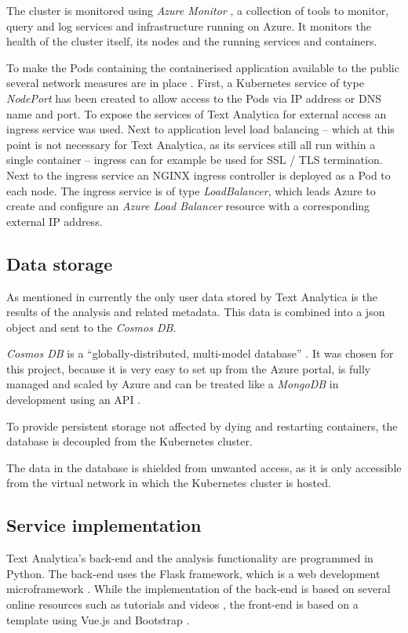\documentclass[conference]{IEEEtran}
\begin{document}
The cluster is monitored using \textit{Azure Monitor} \cite{AzureMonitor}, a collection of tools to monitor, query and log services and infrastructure running on Azure. It monitors the health of the cluster itself, its nodes and the running services and containers. 

To make the Pods containing the containerised application available to the public several network measures are in place \cite{AKSNetworks, AzureExposeKubernetesCluster}. First, a Kubernetes service of type \textit{NodePort} has been created to allow access to the Pods via IP address or DNS name and port. To expose the services of Text Analytica for external access an ingress service was used. Next to application level load balancing – which at this point is not necessary for Text Analytica, as its services still all run within a single container – ingress can for example be used for SSL / TLS termination. Next to the ingress service an NGINX ingress controller is deployed as a Pod to each node. The ingress service is of type \textit{LoadBalancer}, which leads Azure to create and configure an \textit{Azure Load Balancer} resource with a corresponding external IP address.

\subsection{Data storage}
As mentioned in  currently the only user data stored by Text Analytica is the results of the analysis and related metadata. This data is combined into a json object and sent to the \textit{Cosmos DB}.

\textit{Cosmos DB} is a “globally-distributed, multi-model database” \cite{CosmosDB}. It was chosen for this project, because it is very easy to set up from the Azure portal, is fully managed and scaled by Azure and can be treated like a \textit{MongoDB} in development using an API \cite{CosmosMongoDB}.

To provide persistent storage not affected by dying and restarting containers, the database is decoupled from the Kubernetes cluster.

The data in the database is shielded from unwanted access, as it is only accessible from the virtual network in which the Kubernetes cluster is hosted.

\subsection{Service implementation}
Text Analytica’s back-end and the analysis functionality are programmed in Python. The back-end uses the Flask framework, which is a web development microframework \cite{Flask}. While the implementation of the back-end is based on several online resources such as tutorials and videos \cite{FlaskOnKubernetes, FlaskVue, FlaskMongo}, the front-end is based on a template using Vue.js and Bootstrap \cite{Bootstrap}.
\end{document}
